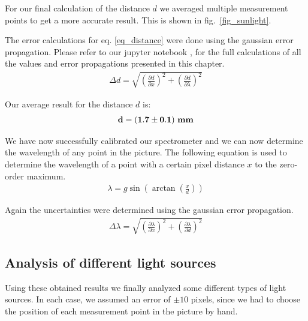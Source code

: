 For our final calculation of the distance $d$ we averaged multiple measurement points to get a more
accurate result. This is shown in fig.~\ref{fig_sunlight}.

The error calculations for eq. \ref{eq_distance} were done using the gaussian error propagation.
Please refer to our jupyter notebook \cite{GitHub}, for the full calculations of all the values and 
error propagations presented in this chapter. 
\begin{align}
    \Delta d = \sqrt{\left(\frac{\partial d}{\partial x}\right)^2 + \left(\frac{\partial d}{\partial \lambda}\right)^2}
\end{align}

Our average result for the distance $d$ is:
\begin{align}
    \bf d = (1.7 \pm 0.1) ~\si{\bf\milli\meter} \label{res_d}
\end{align}

We have now successfully calibrated our spectrometer and we can now determine the wavelength
of any point in the picture.
The following equation is used to determine the wavelength of a point with a certain pixel 
distance $x$ to the zero-order maximum.
\begin{align}
    \lambda = g \sin\left(\arctan\left(\frac{x}{d}\right)\right) \label{eq_lambda}
\end{align}

Again the uncertainties were determined using the gaussian error propagation.
\begin{align}
    \Delta \lambda = \sqrt{\left(\frac{\partial \lambda}{\partial x}\right)^2 + \left(\frac{\partial \lambda}{\partial d}\right)^2}
\end{align}

\newpage

\subsection{Analysis of different light sources}

Using these obtained results we finally analyzed some different types of light sources. In each case, we assumed 
an error of $\pm 10$ pixels, since we had to choose the position of each measurement point in the picture by hand.

